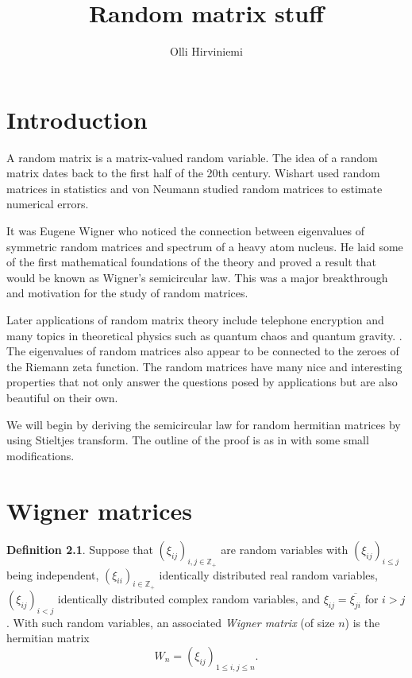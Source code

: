\documentclass[12pt,a4paper,leqno]{report}
\title{Random matrix stuff}
\author{Olli Hirviniemi}
\date{}
\newcommand{\Z}{\mathbb{Z}}
\theoremstyle{plain}
\theoremstyle{definition}
\newtheorem{defi}[equation]{Definition}
\theoremstyle{remark}
\begin{document}
\maketitle

\tableofcontents

\chapter{Introduction}
\label{intro}

A random matrix is a matrix-valued random variable. The idea of a random matrix dates back to the first half of the 20th century. Wishart \cite{Wis} used random matrices in statistics and von Neumann \cite{Neu} studied random matrices to estimate numerical errors.

It was Eugene Wigner \cite{Wig1} who noticed the connection between eigenvalues of symmetric random matrices and spectrum of a heavy atom nucleus. He laid some of the first mathematical foundations of the theory \cite{Wig2} and proved a result that would be known as Wigner's semicircular law. This was a major breakthrough and motivation for the study of random matrices.

Later applications of random matrix theory include telephone encryption and many topics in theoretical physics such as quantum chaos and quantum gravity. \cite{Diac}. The eigenvalues of random matrices also appear to be connected to the zeroes of the Riemann zeta function. \cite{Rud} The random matrices have many nice and interesting properties that not only answer the questions posed by applications but are also beautiful on their own.

We will begin by deriving the semicircular law for random hermitian matrices by using Stieltjes transform. The outline of the proof is as in \cite{Tao} with some small modifications.



\chapter{Wigner matrices}
\label{setup}

\begin{defi}
Suppose that $(\xi_{ij})_{i,j \in \Z_+}$ are random variables with $(\xi_{ij})_{i \leq j}$ being independent, $(\xi_{ii})_{i \in \Z_+}$ identically distributed real random variables, $(\xi_{ij})_{i<j}$ identically distributed complex random variables, and $\xi_{ij}=\overline{\xi_{ji}}$ for $i>j$. With such random variables, an associated \emph{Wigner matrix} (of size $n$) is the hermitian matrix
\begin{equation*}
W_n = (\xi_{ij})_{1\leq i,j \leq n}.
\end{equation*} 
\end{defi}
\end{document}
